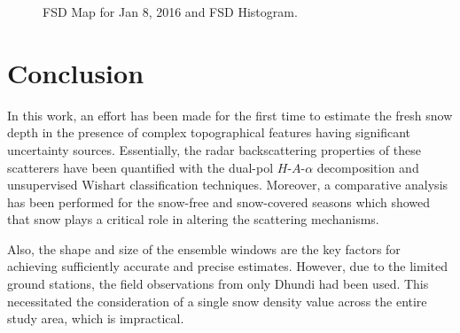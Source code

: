 \documentclass{article}
\begin{document}
\begin{figure}[htb]
\begin{subfigure}[t]{0.49\columnwidth}
        \vspace{-1ex}
        \caption{}
        \label{subfig:fsd_hist}
    \end{subfigure}
    \vspace{-2ex}
    \caption{\textbf{} FSD Map for Jan 8, 2016 and \textbf{} FSD Histogram.}
    \label{fig:fsd_res}
\end{figure}

\section{Conclusion}
\label{sec:concl}
In this work, an effort has been made for the first time to estimate the fresh snow depth in the presence of complex topographical features having significant uncertainty sources. Essentially, the radar backscattering properties of these scatterers have been quantified with the dual-pol $H$-$A$-$\alpha$ decomposition and unsupervised Wishart classification techniques. Moreover, a comparative analysis has been performed for the snow-free and snow-covered seasons which showed that snow plays a critical role in altering the scattering mechanisms. 

Also, the shape and size of the ensemble windows are the key factors for achieving sufficiently accurate and precise estimates. However, due to the limited ground stations, the field observations from only Dhundi had been used. This necessitated the consideration of a single snow density value across the entire study area, which is impractical.
\end{document}
